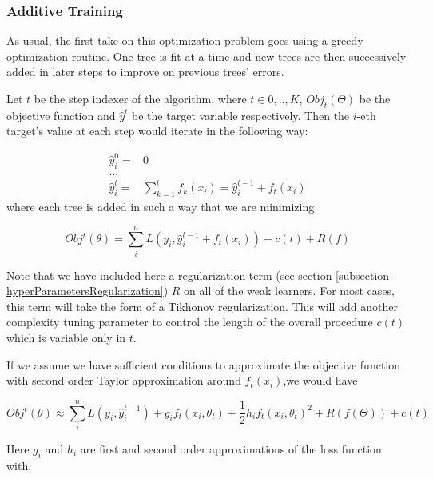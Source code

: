 \subsubsection{Additive Training}

As usual, the first take on this optimization problem goes using a greedy optimization routine. One tree is fit at a time and new trees are then successively added in later steps to improve on previous trees' errors.

Let $t$ be the step indexer of the algorithm, where $t \in {0,..,K}$, $Obj_t(\Theta)$ be the objective function and $\hat{y}^t$ be the target variable respectively. Then the $i$-eth target's value at each step would iterate in the following way:

\begin{equation} \label{eq:gb-targetSteps}
\begin{split}
\hat{y}_i^0 = & 0 \\
... \\
\hat{y}_i^t = &\sum_{k=1}^{t} f_k(x_i) = \hat{y}^{t-1}_i +  f_t(x_i)
\end{split}
\end{equation}
where each tree is added in such a way that we are minimizing

\begin{equation}
Obj^t(\theta) =  \sum_i^n L(y_i, \hat{y}^{t-1}_i +  f_t(x_i) ) + c(t) + R(f)
\end{equation}


Note that we have included here a regularization term (see section \ref{subsection-hyperParametersRegularization}) $R$ on all of the weak learners. For most cases,  this term will take the form of a Tikhonov regularization. This will add another complexity tuning parameter to control the length of the overall procedure $c(t)$ which is variable only in $t$.

If we assume we have sufficient conditions to approximate the objective function with second order Taylor approximation around $f_t(x_i)$,we would have

\begin{equation}\label{equation-gradientBoostingTaylor}
Obj^t(\theta) \approx \sum_i^n {L(y_i, \hat{y}^{t-1}_i) + g_i f_t(x_i,\theta_t) + \frac{1}{2} h_i f_t(x_i,\theta_t)^2 } +  R(f(\Theta)) +  c(t)
\end{equation}

Here $g_i$ and $h_i$ are first and second order approximations of the loss function with,

